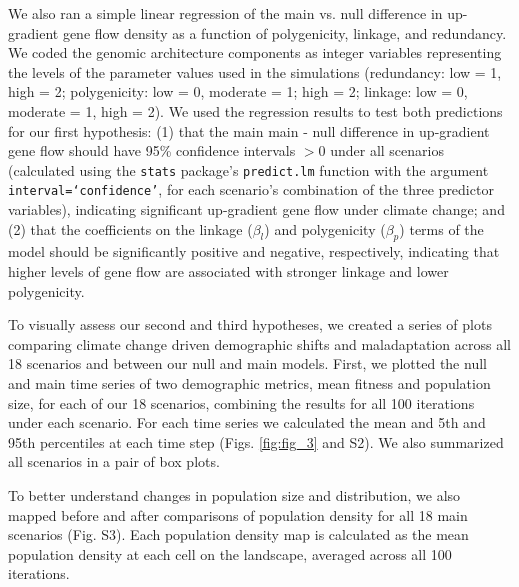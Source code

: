 \documentclass[9pt,twocolumn,twoside,lineno]{new_article}
\begin{document}
We also ran a simple linear regression
of the main vs. null difference in up-gradient gene flow density
as a function of polygenicity, linkage, and redundancy. We coded the genomic architecture components
as integer variables
representing the levels of the
parameter values used in the simulations (redundancy: low = 1, high = 2;
polygenicity: low = 0, moderate = 1; high = 2;
linkage: low = 0, moderate = 1, high = 2).
We used the regression results
to test both predictions for our first hypothesis: (1) that the main main - null difference in up-gradient gene flow
should have 95\% confidence intervals $>0$ under all scenarios
(calculated using the \texttt{stats} package's \texttt{predict.lm} function with
the argument \texttt{interval=`confidence'}, for each scenario's combination of the three predictor variables),
indicating significant up-gradient gene flow under climate change; and (2) that the coefficients on the linkage ($\beta_{l}$) and polygenicity ($\beta_{p}$)
terms of the model should be significantly positive and
negative, respectively, indicating that higher levels of gene flow are associated with stronger linkage and lower polygenicity.

To visually assess our second and third hypotheses, we created a series of
plots comparing climate change driven demographic shifts
and maladaptation across all 18 scenarios and between our null and main models.
First, we plotted the 
null and main time series of two demographic
metrics, mean fitness and population size, for 
each of our 18 scenarios, combining the results for all 100 iterations under each scenario. For each time series we calculated the mean and 5th and 95th percentiles at each time step (Figs. \ref{fig:fig_3} and S2).
We also summarized all scenarios in a pair of box plots.

To better understand changes in population size and distribution,
we also mapped before and after comparisons of population density for all 18
main scenarios (Fig. S3).
Each population density map is calculated as
the mean population density at each cell on the landscape,
averaged across all 100 iterations.
\end{document}
